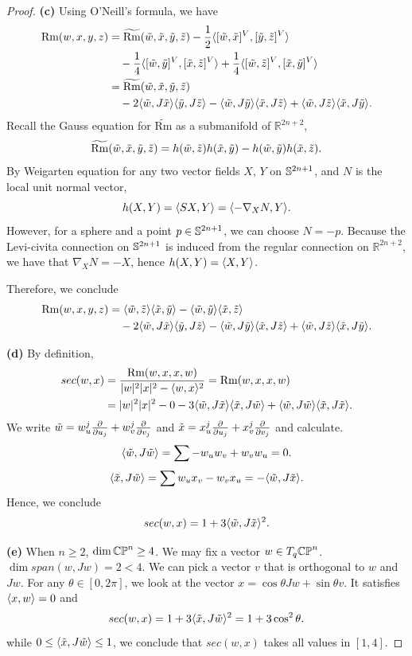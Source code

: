 \documentclass[11pt, a4paper]{article}
\theoremstyle{plain}
\theoremstyle{definition}
\theoremstyle{remark}
\begin{document}
{\begin{proof}
    \textbf{(c)} Using O'Neill's formula, we have
    \begin{align*}
        \text{Rm}(w, x, y, z) &= \widetilde{\text{Rm}}(\tilde w, \tilde x, \tilde y, \tilde z) - \frac{1}{2} \langle [\tilde w,\tilde x]^V,[\tilde y,\tilde z]^V\rangle \\
        &\quad - \frac{1}{4} \langle [\tilde w,\tilde y]^V,[\tilde x,\tilde z]^V\rangle + \frac{1}{4} \langle [\tilde w,\tilde z]^V,[\tilde x,\tilde y]^V\rangle\\
        &= \widetilde{\text{Rm}}(\tilde w, \tilde x, \tilde y, \tilde z)\\
        &\quad -2\langle \tilde w,J\tilde x\rangle\langle \tilde y,J\tilde z\rangle - \langle \tilde w,J\tilde y\rangle\langle \tilde x,J\tilde z\rangle + \langle \tilde w,J\tilde z\rangle\langle \tilde x,J\tilde y\rangle.
    \end{align*}
    Recall the Gauss equation for $\widetilde{\text{Rm}}$ as a submanifold of $\mathbb{R}^{2n+2}$,
    \[\widetilde{\text{Rm}}(\tilde w, \tilde x, \tilde y, \tilde z) =  h(\tilde w,\tilde z)h(\tilde x,\tilde y) -h(\tilde w,\tilde y)h(\tilde x,\tilde z) .\]
    By Weigarten equation for any two vector fields $X,\,Y$ on $\mathbb{S}^{2n+1}$, and $N$ is the local unit normal vector,
    \[h(X,Y) = \langle SX,Y\rangle = \langle -\nabla_X N,Y\rangle.\]
    However, for a sphere and a point $p\in \mathbb{S}^{2n+1}$, we can choose $N = -p$. Because the Levi-civita connection on $\mathbb{S}^{2n+1}$ is
    induced from the regular connection on $\mathbb{R}^{2n+2}$, we have that $\nabla_X N = -X$, hence $h(X,Y) = \langle X,Y\rangle$.

    Therefore, we conclude
    \begin{align*}
        \text{Rm}(w, x, y, z) &= \langle \tilde w,\tilde z\rangle\langle \tilde x,\tilde y\rangle-\langle \tilde w,\tilde y\rangle\langle \tilde x,\tilde z\rangle\\
        &\quad -2\langle \tilde w,J\tilde x\rangle\langle \tilde y,J\tilde z\rangle - \langle \tilde w,J\tilde y\rangle\langle \tilde x,J\tilde z\rangle + \langle \tilde w,J\tilde z\rangle\langle \tilde x,J\tilde y\rangle.
    \end{align*}
    
    \textbf{(d)} By definition, 
    \begin{align*}
        sec(w,x) &= \frac{\text{Rm}(w, x, x, w)}{|w|^2|x|^2 - \langle w,x\rangle^2} = \text{Rm}(w, x, x, w)\\
        &= |w|^2|x|^2 - 0 - 3\langle \tilde w,J\tilde x\rangle\langle \tilde x,J\tilde w\rangle + \langle \tilde w,J\tilde w\rangle\langle \tilde x,J\tilde x\rangle.
    \end{align*}
    We write $\tilde w = w_u^j\frac{\partial}{\partial u_j} + w_v^j\frac{\partial}{\partial v_j}$ and $\tilde x = x_u^j\frac{\partial}{\partial u_j} + x_v^j\frac{\partial}{\partial v_j}$ and calculate.
    \[\langle \tilde w,J\tilde w\rangle = \sum -w_u w_v + w_vw_u = 0.\]
    \[\langle \tilde x,J\tilde w\rangle = \sum w_ux_v - w_vx_u = -\langle \tilde w,J\tilde x\rangle.\]
    Hence, we conclude
    \[ sec(w,x) = 1 + 3\langle \tilde w,J\tilde x\rangle^2.\]

    \textbf{(e)} When $n\ge 2$, $\dim \mathbb{CP}^{n} \ge 4$. We may fix a vector $w\in T_q\mathbb{CP}^{n}$. $\dim span(w,Jw) = 2 < 4$. We can pick a vector
    $v$ that is orthogonal to $w$ and $Jw$. For any $\theta \in [0,2\pi]$, we look at the vector $x = \cos\theta Jw + \sin\theta v$.
    It satisfies $\langle x,w\rangle = 0$ and 
    $$sec(w,x) = 1+ 3\langle \tilde x , J\tilde w\rangle^2 = 1 + 3\cos^2\theta.$$
    while $0\le \langle \tilde x , J\tilde w\rangle\le 1$, we conclude that $sec(w,x)$ takes all values in $[1,4]$.


\end{proof}}
\end{document}
